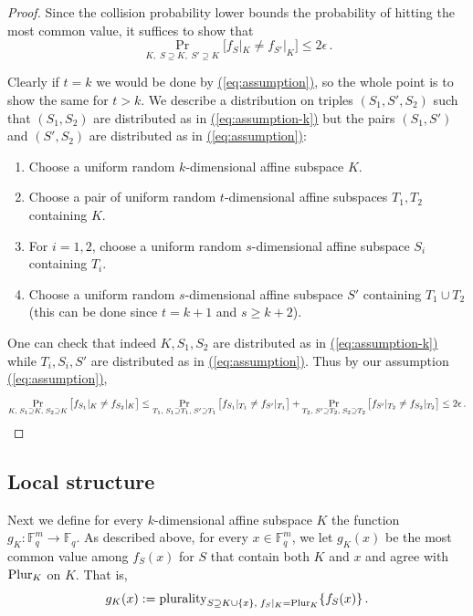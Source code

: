 \documentclass[11pt]{article}
\numberwithin{equation}{section}
\newtheorem{lemma}[theorem]{Lemma}
\theoremstyle{definition}
\theoremstyle{plain}
\renewcommand{\eqref}[1]{\hyperref[#1]{(\ref*{#1})}}
\theoremstyle{plain}
\newcommand{\E}{{\mathbb{E}}}
\newcommand{\F}{{\mathbb{F}}}
\newcommand{\eps}{\epsilon}
\newcommand{\plurality}{{\rm{plurality}}}
\newcommand{\pl}{{\rm{Plur}}}
\begin{document}
\begin{proof}
Since the collision probability lower bounds the probability of hitting the most common value, it suffices to show that
\begin{equation}\label{eq:assumption-k}
\Pr_{K, \; S \supseteq K,\;S' \supseteq K}\big[f_S|_K \neq f_{S'}|_K\big] \leq 2\epsilon\,.
\end{equation}

Clearly if $t=k$ we would be done by \eqref{eq:assumption}, so the whole point is to show the same for $t>k$. We describe a distribution on triples $(S_1,S',S_2)$ such that $(S_1,S_2)$ are distributed as in \eqref{eq:assumption-k} but the pairs $(S_1,S')$ and $(S',S_2)$ are distributed as in \eqref{eq:assumption}:
\begin{enumerate}
  \item Choose a uniform random $k$-dimensional affine subspace $K$.
  \item Choose a pair of uniform random $t$-dimensional affine subspaces $T_1,T_2$ containing $K$.
    \item For $i=1,2$, choose a uniform random $s$-dimensional affine subspace $S_i$ containing $T_i$.
  \item Choose a uniform random $s$-dimensional affine subspace $S'$ containing $T_1 \cup T_2$ (this can be done since $t=k+1$ and $s\geq k+2$).
\end{enumerate}

One can check that indeed $K,S_1,S_2$ are distributed as in \eqref{eq:assumption-k}  while  $T_i,S_i,S'$ are distributed as in \eqref{eq:assumption}. Thus by our assumption \eqref{eq:assumption},
\[ \Pr_{K, \; S_1 \supseteq K,\;S_2 \supseteq K}\big[f_{S_1}|_K \neq
  f_{S_2}|_K\big] \le   \Pr_{T_1, \; S_1 \supseteq T_1,\;S' \supseteq
    T_1}\big[ f_{S_1}|_{T_1}\neq f_{S'}|_{T_1}\big] + \Pr_{T_2, \; S'
    \supseteq T_2,\;S_2 \supseteq T_2}\big[f_{S'}|_{T_2}\neq
  f_{S_2}|_{T_2}\big] \le 2\eps\,. \qedhere \]
\end{proof}
%
%

\subsection{Local structure}\label{subsec:local-struct}

Next we define for every $k$-dimensional affine subspace $K$ the function $g_K: \F_q^m \to \F_q$. As described above,  for every $x \in \F_q^m$, we let $g_K(x)$ be the most common value among $f_S(x)$ for $S$ that contain both $K$ and $x$ and agree with $\pl_K$ on $K$. That is,
\[g_K(x) : = \plurality_{S \supseteq K \cup \{x\},\; f_S|_K = \pl_K} \{f_S(x)\}\,.\]
\end{document}
